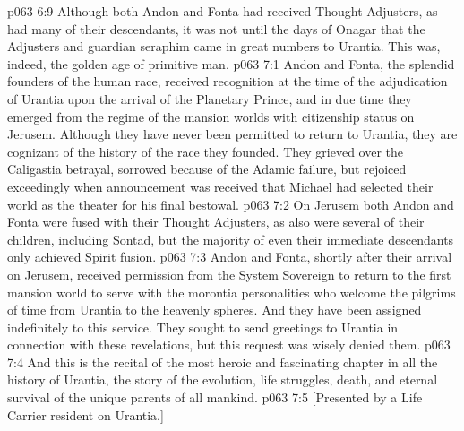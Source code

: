 \vs p063 6:9 Although both Andon and Fonta had received Thought Adjusters, as had many of their descendants, it was not until the days of Onagar that the Adjusters and guardian seraphim came in great numbers to Urantia. This was, indeed, the golden age of primitive man.
\vs p063 7:1 Andon and Fonta, the splendid founders of the human race, received recognition at the time of the adjudication of Urantia upon the arrival of the Planetary Prince, and in due time they emerged from the regime of the mansion worlds with citizenship status on Jerusem. Although they have never been permitted to return to Urantia, they are cognizant of the history of the race they founded. They grieved over the Caligastia betrayal, sorrowed because of the Adamic failure, but rejoiced exceedingly when announcement was received that Michael had selected their world as the theater for his final bestowal.
\vs p063 7:2 On Jerusem both Andon and Fonta were fused with their Thought Adjusters, as also were several of their children, including Sontad, but the majority of even their immediate descendants only achieved Spirit fusion.
\vs p063 7:3 Andon and Fonta, shortly after their arrival on Jerusem, received permission from the System Sovereign to return to the first mansion world to serve with the morontia personalities who welcome the pilgrims of time from Urantia to the heavenly spheres. And they have been assigned indefinitely to this service. They sought to send greetings to Urantia in connection with these revelations, but this request was wisely denied them.
\pc \vs p063 7:4 And this is the recital of the most heroic and fascinating chapter in all the history of Urantia, the story of the evolution, life struggles, death, and eternal survival of the unique parents of all mankind.
\vsetoff
\vs p063 7:5 [Presented by a Life Carrier resident on Urantia.]
